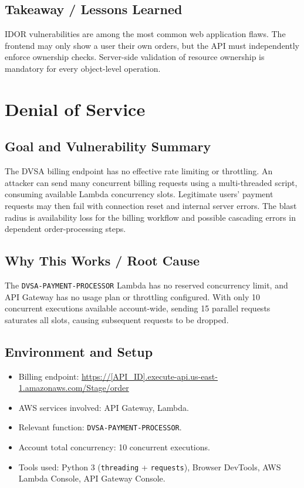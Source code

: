 \documentclass[12pt]{report}
\begin{document}
\section{Takeaway / Lessons Learned}
IDOR vulnerabilities are among the most common web application flaws. The frontend may only show a user their own orders, but the API must independently enforce ownership checks. Server-side validation of resource ownership is mandatory for every object-level operation.

\clearpage

\chapter{Denial of Service}

\section{Goal and Vulnerability Summary}
The DVSA billing endpoint has no effective rate limiting or throttling. An attacker can send many concurrent billing requests using a multi-threaded script, consuming available Lambda concurrency slots. Legitimate users' payment requests may then fail with connection reset and internal server errors. The blast radius is availability loss for the billing workflow and possible cascading errors in dependent order-processing steps.

\section{Why This Works / Root Cause}
The \texttt{DVSA-PAYMENT-PROCESSOR} Lambda has no reserved concurrency limit, and API Gateway has no usage plan or throttling configured. With only 10 concurrent executions available account-wide, sending 15 parallel requests saturates all slots, causing subsequent requests to be dropped.

\section{Environment and Setup}
\begin{itemize}
  \item Billing endpoint: \url{https://[API_ID].execute-api.us-east-1.amazonaws.com/Stage/order}
  \item AWS services involved: API Gateway, Lambda.
  \item Relevant function: \texttt{DVSA-PAYMENT-PROCESSOR}.
  \item Account total concurrency: 10 concurrent executions.
  \item Tools used: Python 3 (\texttt{threading} + \texttt{requests}), Browser DevTools, AWS Lambda Console, API Gateway Console.
\end{itemize}
\end{document}
